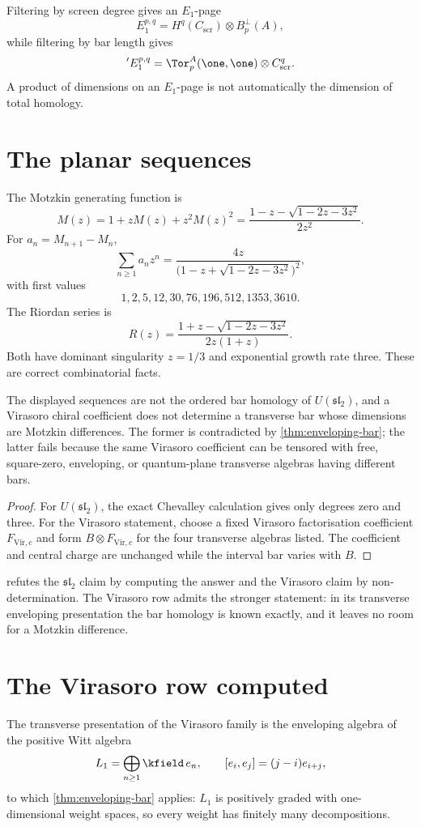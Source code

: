 Filtering by screen degree gives an \(E_1\)-page
\[
 E_1^{p,q}=H^q(C_{\mathrm{scr}})\otimes B_p^\perp(A),
\]
while filtering by bar length gives
\[
 {}'E_1^{p,q}=\Tor_p^A(\one,\one)\otimes C^q_{\mathrm{scr}}.
\]
A product of dimensions on an \(E_1\)-page is not automatically the dimension of total homology.

\section{The planar sequences}
The Motzkin generating function is
\[
 M(z)=1+zM(z)+z^2M(z)^2
 =\frac{1-z-\sqrt{1-2z-3z^2}}{2z^2}.
\]
For \(a_n=M_{n+1}-M_n\),
\[
 \sum_{n\ge1}a_nz^n
 =\frac{4z}{\bigl(1-z+\sqrt{1-2z-3z^2}\bigr)^2},
\]
with first values
\[
 1,2,5,12,30,76,196,512,1353,3610.
\]
The Riordan series is
\[
 R(z)=\frac{1+z-\sqrt{1-2z-3z^2}}{2z(1+z)}.
\]
Both have dominant singularity \(z=1/3\) and exponential growth rate three.  These are correct combinatorial facts.

\begin{theorem}\label{thm:legacy-audit}
The displayed sequences are not the ordered bar homology of \(U(\mathfrak{sl}_2)\), and a Virasoro chiral coefficient does not determine a transverse bar whose dimensions are Motzkin differences.  The former is contradicted by \cref{thm:enveloping-bar}; the latter fails because the same Virasoro coefficient can be tensored with free, square-zero, enveloping, or quantum-plane transverse algebras having different bars.
\end{theorem}
\begin{proof}
For \(U(\mathfrak{sl}_2)\), the exact Chevalley calculation gives only degrees zero and three.  For the Virasoro statement, choose a fixed Virasoro factorisation coefficient \(F_{\mathrm{Vir},c}\) and form \(B\otimes F_{\mathrm{Vir},c}\) for the four transverse algebras listed.  The coefficient and central charge are unchanged while the interval bar varies with \(B\).
\end{proof}

 refutes the \(\mathfrak{sl}_2\) claim by computing the
answer and the Virasoro claim by non-determination.  The Virasoro row admits the
stronger statement: in its transverse enveloping presentation the bar homology is
known exactly, and it leaves no room for a Motzkin difference.

\section{The Virasoro row computed}
The transverse presentation of the Virasoro family is the enveloping algebra of
the positive Witt algebra
\[
 L_1=\bigoplus_{n\ge1}\kfield\,e_n,
 \qquad
 [e_i,e_j]=(j-i)e_{i+j},
\]
to which \cref{thm:enveloping-bar} applies: \(L_1\) is positively graded with
one-dimensional weight spaces, so every weight has finitely many decompositions.

